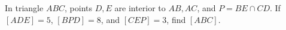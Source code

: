 In triangle $ABC$, points $D,E$ are interior to $AB,AC$, and $P=BE\cap CD$. If $[ADE]=5$, $[BPD]=8$, and $[CEP]=3$, find $[ABC]$.
